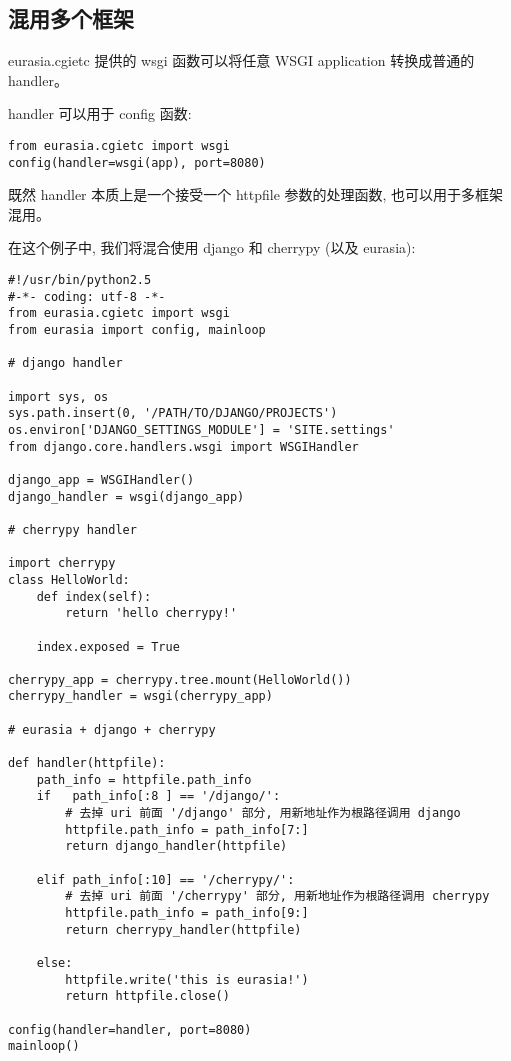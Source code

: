 \documentclass{manual}
\begin{document}
\subsection{混用多个框架}

eurasia.cgietc 提供的 wsgi 函数可以将任意 WSGI application 转换成普通的 handler。

handler 可以用于 config 函数:

\begin{verbatim}
from eurasia.cgietc import wsgi
config(handler=wsgi(app), port=8080)
\end{verbatim}

既然 handler 本质上是一个接受一个 httpfile 参数的处理函数, 也可以用于多框架混用。

在这个例子中, 我们将混合使用 django 和 cherrypy (以及 eurasia):

\begin{verbatim}
#!/usr/bin/python2.5
#-*- coding: utf-8 -*-
from eurasia.cgietc import wsgi
from eurasia import config, mainloop

# django handler

import sys, os
sys.path.insert(0, '/PATH/TO/DJANGO/PROJECTS')
os.environ['DJANGO_SETTINGS_MODULE'] = 'SITE.settings'
from django.core.handlers.wsgi import WSGIHandler

django_app = WSGIHandler()
django_handler = wsgi(django_app)

# cherrypy handler

import cherrypy
class HelloWorld:
	def index(self):
		return 'hello cherrypy!'

	index.exposed = True

cherrypy_app = cherrypy.tree.mount(HelloWorld())
cherrypy_handler = wsgi(cherrypy_app)

# eurasia + django + cherrypy

def handler(httpfile):
	path_info = httpfile.path_info
	if   path_info[:8 ] == '/django/':
		# 去掉 uri 前面 '/django' 部分, 用新地址作为根路径调用 django
		httpfile.path_info = path_info[7:]
		return django_handler(httpfile)

	elif path_info[:10] == '/cherrypy/':
		# 去掉 uri 前面 '/cherrypy' 部分, 用新地址作为根路径调用 cherrypy
		httpfile.path_info = path_info[9:]
		return cherrypy_handler(httpfile)

	else:
		httpfile.write('this is eurasia!')
		return httpfile.close()

config(handler=handler, port=8080)
mainloop()
\end{verbatim}
\end{document}
